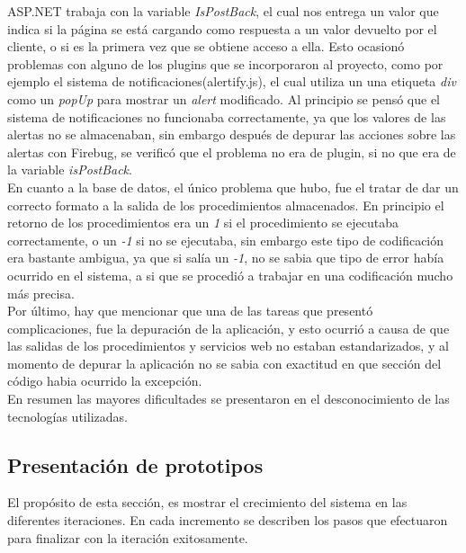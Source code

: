 ASP.NET trabaja con la variable \textit{IsPostBack}, el cual nos entrega un valor que indica si la página se está cargando como respuesta a un valor devuelto por el cliente, o si es la primera vez que se obtiene acceso a ella. Esto ocasionó  problemas con alguno de los plugins que se incorporaron  al proyecto, como por ejemplo el sistema de notificaciones(alertify.js), el cual utiliza un una etiqueta \textit{div} como un  \textit{popUp} para mostrar un \textit{alert} modificado. Al principio se pensó que el sistema de notificaciones no funcionaba correctamente, ya que los valores de las alertas no se almacenaban, sin  embargo después de depurar las acciones sobre las alertas con Firebug, se verificó que el problema no era de plugin, si no que era de la variable \textit{isPostBack}.
\\

En cuanto a la base de datos, el único problema que hubo, fue el tratar de dar un correcto formato a la salida de los procedimientos almacenados. En principio el retorno de los procedimientos era  un \textit{1} si el procedimiento se ejecutaba correctamente, o un \textit{-1} si no se ejecutaba, sin embargo este tipo de codificación era bastante ambigua, ya que si salía un \textit{-1}, no se sabia que tipo de error había ocurrido en el sistema, a si que se procedió a trabajar en una codificación 
 mucho más precisa.
\\

Por último, hay que mencionar que una de las tareas  que presentó complicaciones, fue la depuración de la aplicación, y esto ocurrió a causa de que las salidas de los procedimientos y servicios web no estaban estandarizados, y al momento de depurar la aplicación no se sabia con exactitud en que sección del código habia ocurrido la excepción.
\\

En resumen las mayores dificultades se presentaron en el desconocimiento de las tecnologías utilizadas.


\subsection{Presentación de prototipos}

El propósito de esta sección, es mostrar el crecimiento del sistema en las diferentes iteraciones. En cada incremento se describen los pasos que efectuaron para finalizar con la iteración exitosamente.


